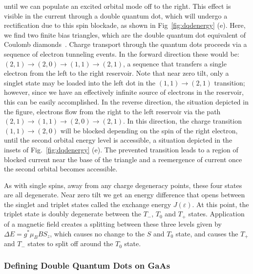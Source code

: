until we can populate an excited orbital mode off to the right. This effect is visible in the current through a double
quantum dot, which will undergo a rectification due to this spin blockade, as shown in Fig~\ref{fig:dqdenergy} (e).
Here, we find two finite bias triangles, which are the double quantum dot equivalent of Coulomb diamonds~\cite{PhysRevB.72.165308}.
Charge transport through the quantum dots proceeds via a sequence of electron tunneling events. In the forward direction
these would be: $(2, 1) \rightarrow (2, 0) \rightarrow (1, 1) \rightarrow (2, 1)$, a sequence that transfers a single electron
from the left to the right reservoir. Note that near zero tilt, only a singlet state may be loaded into the left dot
in the $(1, 1) \rightarrow (2, 1)$ transition; however, since we have an effectively infinite source of electrons in the
reservoir, this can be easily accomplished. In the reverse direction, the situation depicted in the figure, electrons flow
from the right to the left reservoir via the path $(2, 1) \rightarrow (1, 1) \rightarrow (2, 0) \rightarrow (2, 1)$.
In this direction, the charge transition $(1, 1) \rightarrow (2, 0)$ will be blocked depending on the spin of the right
electron, until the second orbital energy level is accessible, a situation depicted in the insets of Fig.~\ref{fig:dqdenergy} (e).
The prevented transition leads to a region of blocked current near the base of the triangle and a reemergence of current once the second orbital
becomes accessible.

As with single spins, away from any charge degeneracy points, these four states are all degenerate. Near zero tilt we get an
energy difference that opens between the singlet and triplet states called the exchange energy $J(\varepsilon)$. At this
point, the triplet state is doubly degenerate between the $T_-$, $T_0$ and $T_+$ states. Application of a magnetic field creates
a splitting between these three levels given by $\Delta E = g^* \mu_B B S_z$, which causes no change to the $S$ and $T_0$ state,
and causes the $T_+$ and $T_-$ states to split off around the $T_0$ state.

\subsubsection{Defining Double Quantum Dots on GaAs}

